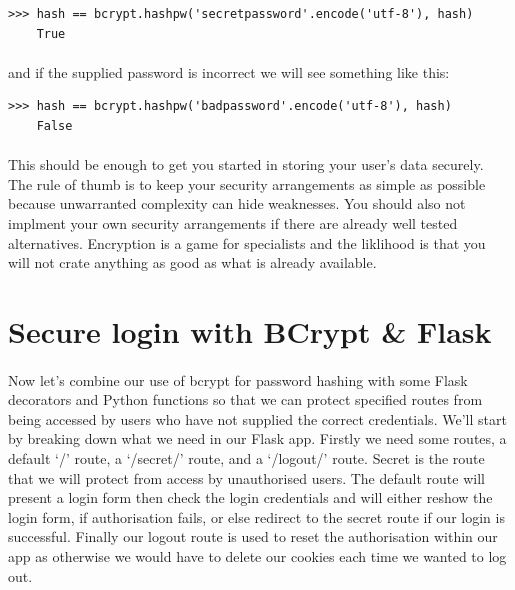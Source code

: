 \documentclass[12pt, a4paper, oneside]{book}
\begin{document}
{\begin{lstlisting}[style=DOS]
    >>> hash == bcrypt.hashpw('secretpassword'.encode('utf-8'), hash)
    True
\end{lstlisting}

\paragraph{} and if the supplied password is incorrect we will see something like this:

\begin{lstlisting}[style=DOS]
    >>> hash == bcrypt.hashpw('badpassword'.encode('utf-8'), hash)
    False
\end{lstlisting}

\paragraph{} This should be enough to get you started in storing your user's data securely. The rule of thumb is to keep your security arrangements as simple as possible because unwarranted complexity can hide weaknesses. You should also not implment your own security arrangements if there are already well tested alternatives. Encryption is a game for specialists and the liklihood is that you will not crate anything as good as what is already available.


\section{Secure login with BCrypt \& Flask}
\label{login}
\paragraph{} Now let's combine our use of bcrypt for password hashing with some Flask decorators and Python functions so that we can protect specified routes from being accessed by users who have not supplied the correct credentials. We'll start by breaking down what we need in our Flask app. Firstly we need some routes, a default `/' route, a `/secret/' route, and a `/logout/' route. Secret is the route that we will protect from access by unauthorised users. The default route will present a login form then check the login credentials and will either reshow the login form, if authorisation fails, or else redirect to the secret route if our login is successful. Finally our logout route is used to reset the authorisation within our app as otherwise we would have to delete our cookies each time we wanted to log out.

}
\end{document}
